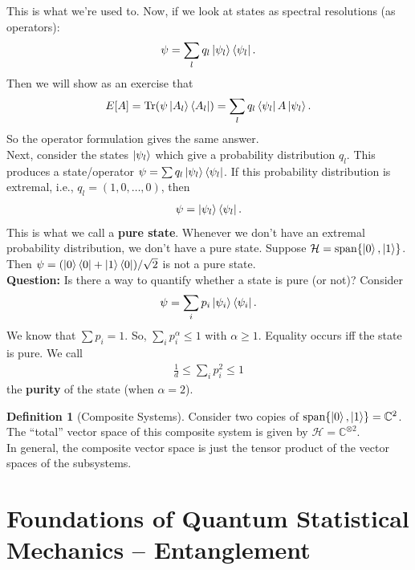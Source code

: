 \documentclass{book}
\theoremstyle{definition}
\newtheorem{defn}{Definition}[section]
\newcommand{\had}{\mathcal{H}}
\newcommand{\al}{\alpha}
\newcommand{\f}[2]{\frac{#1}{#2}}
\begin{document}
This is what we're used to. Now, if we look at states as spectral resolutions (as operators):
\begin{align}
\psi = \sum_l q_l \ket{\psi_l}\bra{\psi_l}.
\end{align}
Then we will show as an exercise that
\begin{align}
E[A] = \Tr (\psi \ket{A_l}\bra{A_l}) = \sum_l q_l \bra{\psi_l} A \ket{\psi_l}.
\end{align}
So the operator formulation gives the same answer. \\


Next, consider the states $\ket{\psi_l}$ which give a probability distribution $q_l$. This produces a state/operator $\psi = \sum q_l \ket{\psi_l}\bra{\psi_l}$. If this probability distribution is extremal, i.e., $q_l = (1,0,\dots,0)$, then 
\begin{align}
\psi = \ket{\psi_l}\bra{\psi_l}.
\end{align}
This is what we call a \textbf{pure state}. Whenever we don't have an extremal probability distribution, we don't have a pure state. Suppose $\had = \text{span}\{ \ket{0}, \ket{1} \}$. Then $\psi = (\ket{0}\bra{0} + \ket{1}\bra{0})/\sqrt{2}$ is not a pure state. \\

\textbf{Question:} Is there a way to quantify whether a state is pure (or not)?  Consider
\begin{align}
\psi = \sum_i p_i \ket{\psi_i}\bra{\psi_i}.
\end{align}
We know that $\sum p_i = 1$. So, $\sum_i p_i^\al \leq 1$ with $\al\geq 1$. Equality occurs iff the state is pure. We call 
\begin{align}
\f{1}{d} \leq \sum_i p_i^2 \leq 1
\end{align}
the \textbf{purity} of the state (when $\al = 2$). \\

\begin{defn}[Composite Systems]
	Consider two copies of $\text{span}\{ \ket{0}, \ket{1} \} = \mathbb{C}^2$. The ``total'' vector space of this composite system is given by $\had = \mathbb{C}^{\otimes 2}$. \\
	
	In general, the composite vector space is just the tensor product of the vector spaces of the subsystems. 
\end{defn}




\newpage

\section{Foundations of Quantum Statistical Mechanics -- Entanglement}
\end{document}

